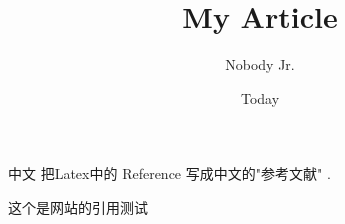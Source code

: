 \documentclass{article}
\newcommand{\upcite}[1]{\textsuperscript{\textsuperscript{\cite{#1}}}}%
\begin{document}
 
\title{My Article}
\author{Nobody Jr.}
\date{Today}
\maketitle
中文 
把Latex中的 Reference 写成\upcite{name1}中文的"参考文献" \upcite{name2}.

这个是网站的引用测试\upcite{website_example1}
\renewcommand\refname{参考献} 
{}
\end{document}
